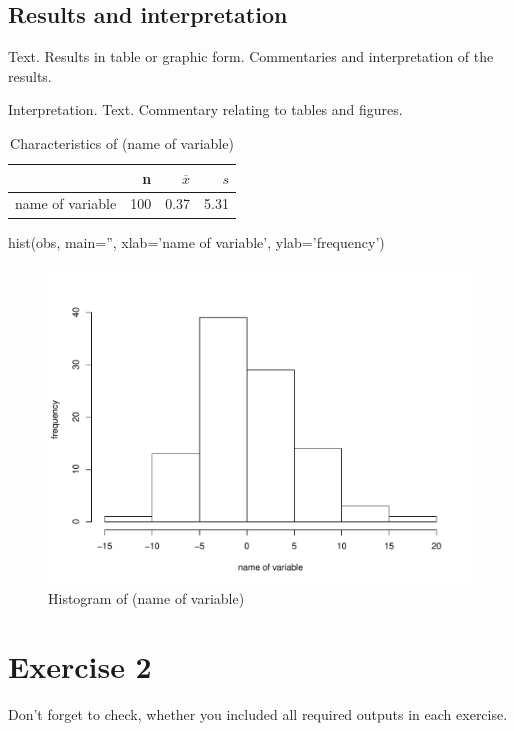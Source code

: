 \documentclass[12pt, oneside]{report}\usepackage[]{graphicx}\usepackage[]{color}
\begin{document}
\bigskip

\subsection*{Results and interpretation}
\noindent Text. Results in table or graphic form. Commentaries and interpretation of the results.

Interpretation. Text. Commentary relating to tables and figures. 

\begin{table}[ht]
\centering
\begin{tabular}{|l|rrr|}
  \hline
 & n & $\overline{x}$ & $s$ \\ 
  \hline
name of variable & 100 & 0.37 & 5.31 \\ 
   \hline
\end{tabular}
\caption{Characteristics of (name of variable)} 
\end{table}


\begin{Schunk}
\begin{Sinput}
hist(obs, main='', xlab='name of variable', ylab='frequency')
\end{Sinput}
\begin{figure}[h]

{\centering \includegraphics[width=.6\textheight,height=.45\textheight]{figure/unnamed-chunk-3-1} 

}

\caption[Histogram of (name of variable)]{Histogram of (name of variable)}\label{fig:unnamed-chunk-3}
\end{figure}
\end{Schunk}


\newpage

\section*{Exercise 2}
\noindent Don't forget to check, whether you included all required outputs in each exercise.
\end{document}
